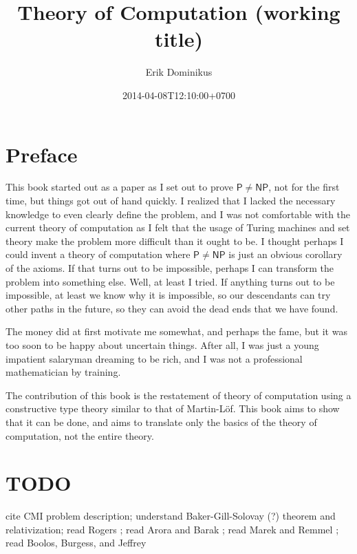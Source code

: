 \documentclass[10pt,statementpaper]{memoir}
\title{Theory of Computation (working title)}
\author{Erik Dominikus}
\date{2014-04-08T12:10:00+0700}
\theoremstyle{definition}
\newcommand\PTIME{\ensuremath{\mathsf{P}}}
\newcommand\NPTIME{\ensuremath{\mathsf{NP}}}
\begin{document}
\frontmatter

\begin{titlingpage}
\maketitle
\end{titlingpage}

\chapter*{Preface}

This book started out as a paper
as I set out to prove $\PTIME \neq \NPTIME$, not for the first time,
but things got out of hand quickly.
I realized that I lacked the necessary knowledge to even clearly define the problem,
and I was not comfortable with the current theory of computation
as I felt that the usage of Turing machines and set theory make the problem more difficult
than it ought to be.
I thought perhaps I could invent a theory of computation
where $\PTIME \neq \NPTIME$ is just an obvious corollary
of the axioms.
If that turns out to be impossible, perhaps I can transform the problem into something else.
Well, at least I tried.
If anything turns out to be impossible, at least we know why it is impossible,
so our descendants can try other paths in the future,
so they can avoid the dead ends that we have found.

The money did at first motivate me somewhat, and perhaps the fame,
but it was too soon to be happy about uncertain things.
After all, I was just a young impatient salaryman dreaming to be rich,
and I was not a professional mathematician by training.

The contribution of this book is the restatement
of theory of computation using a constructive type theory
similar to that of Martin-L\"of.
This book aims to show that it can be done,
and aims to translate only the basics of the theory of computation,
not the entire theory.

\newpage

\tableofcontents
\listoffigures

\mainmatter

\chapter{TODO}

cite CMI problem description;
understand Baker-Gill-Solovay (?) theorem and relativization;
read Rogers \cite{Rogers1987};
read Arora and Barak \cite{Arora2009};
read Marek and Remmel \cite{Marek2009};
read Boolos, Burgess, and Jeffrey \cite{Boolos2002}
\end{document}

